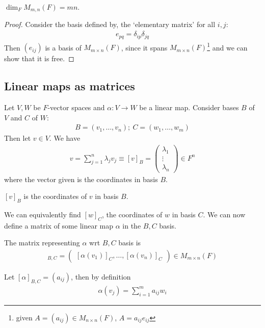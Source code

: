 \begin{proposition}
    $\dim_F M_{m,n}(F) = m n$.
\end{proposition}

\begin{proof}
    Consider the basis defined by, the `elementary matrix' for all $i,j$:
    \begin{align*}
        e_{pq} = \delta_{ip}\delta_{jq}
    \end{align*}
    Then $(e_{ij})$ is a basis of $M_{m \times n}(F)$, since it spans $M_{m \times n}(F)$\footnote{given $A = (a_{ij}) \in M_{n \times n}(F)$, $A = a_{ij} e_{ij}$} and we can show that it is free.
\end{proof}

\subsection{Linear maps as matrices}
Let $V, W$ be $F$-vector spaces and $\alpha : V \to W$ be a linear map.
Consider bases $B$ of $V$ and $C$ of $W$:
\begin{align*}
    B = (v_1, \dots, v_n);\ C = (w_1, \dots, w_m)
\end{align*}
Then let $v \in V$.
We have
\begin{align*}
    v = \sum_{j=1}^n \lambda_j v_j \equiv [v]_B = \begin{pmatrix}
        \lambda_1 \\ \vdots \\ \lambda_n
    \end{pmatrix} \in F^n
\end{align*}
where the vector given is the coordinates in basis $B$.
\begin{notation}
    $[v]_B$ is the coordinates of $v$ in basis $B$.
\end{notation} 
We can equivalently find $[w]_C$, the coordinates of $w$ in basis $C$.
We can now define a matrix of some linear map $\alpha$ in the $B, C$ basis.
\begin{definition}
    The matrix representing $\alpha$ wrt $B, C$ basis is
    \begin{align*}
        [\alpha]_{B,C} = \begin{pmatrix}
            [\alpha(v_1)]_C, \dots, [\alpha(v_n)]_C
        \end{pmatrix} \in M_{m\times n}(F)
    \end{align*}
\end{definition}

\begin{note}
    Let $[\alpha]_{B,C} = (a_{ij})$, then by definition
    \begin{align*}
        \alpha (v_j) = \sum_{i=1}^m a_{ij} w_i
    \end{align*}
\end{note} 

